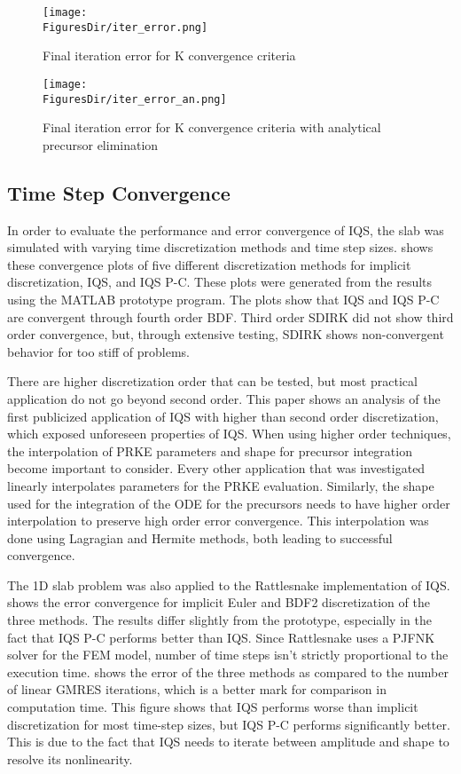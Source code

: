 \begin{figure}[!htbp]
\centering
\texttt{[image: \\FiguresDir/iter\_error.png]}
\caption{Final iteration error for K convergence criteria}
\label{fig:iter_err}
\end{figure}

\begin{figure}[!htbp]
\centering
\texttt{[image: \\FiguresDir/iter\_error\_an.png]}
\caption{Final iteration error for K convergence criteria with analytical precursor elimination}
\label{fig:iter_err_an}
\end{figure}


\subsection{Time Step Convergence}

In order to evaluate the performance and error convergence of IQS, the slab was simulated with varying time discretization methods and time step sizes.   shows these convergence plots of five different discretization methods for implicit discretization, IQS, and IQS P-C.  These plots were generated from the results using the MATLAB prototype program.  The plots show that IQS and IQS P-C are convergent through fourth order BDF.  Third order SDIRK did not show third order convergence, but, through extensive testing, SDIRK shows non-convergent behavior for too stiff of problems.  

There are higher discretization order that can be tested, but most practical application do not go beyond second order.  This paper shows an analysis of the first publicized application of IQS with higher than second order discretization, which exposed unforeseen properties of IQS.  When using higher order techniques, the interpolation of PRKE parameters and shape for precursor integration become important to consider.  Every other application that was investigated linearly interpolates parameters for the PRKE evaluation.  Similarly, the shape used for the integration of the ODE for the precursors needs to have higher order interpolation to preserve high order error convergence.  This interpolation was done using Lagragian and Hermite methods, both leading to successful convergence.

The 1D slab problem was also applied to the Rattlesnake implementation of IQS.   shows the error convergence for implicit Euler and BDF2 discretization of the three methods.  The results differ slightly from the prototype, especially in the fact that IQS P-C performs better than IQS.  Since Rattlesnake uses a PJFNK solver for the FEM model, number of time steps isn't strictly proportional to the execution time.   shows the error of the three methods as compared to the number of linear GMRES iterations, which is a better mark for comparison in computation time.  This figure shows that IQS performs worse than implicit discretization for most time-step sizes, but IQS P-C performs significantly better.  This is due to the fact that IQS needs to iterate between amplitude and shape to resolve its nonlinearity.

